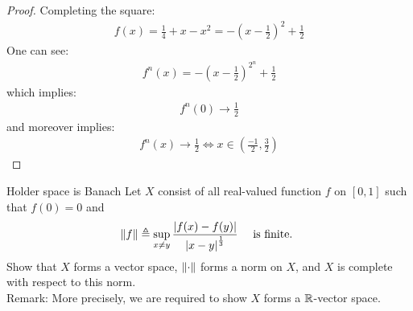 \documentclass{report}
\begin{document}
\begin{proof}
Completing the square: 
\begin{align*}
f(x) = \frac{1}{4}+ x-x^2= - (x-\frac{1}{2})^2+ \frac{1}{2} 
\end{align*}
One can see: 
\begin{align*}
  f^n(x)= - (x- \frac{1}{2})^{2^n}+ \frac{1}{2}
\end{align*}
which implies: 
\begin{align*}
f^n(0) \rightarrow \frac{1}{2} 
\end{align*}
and moreover implies: 
\begin{align*}
  f^n(x)\rightarrow \frac{1}{2}\iff  x \in \left(\frac{-1}{2},\frac{3}{2}\right)
\end{align*}
\end{proof}
\begin{question}{Holder space is Banach}{}
Let $X$ consist of all real-valued function $f$ on  $[0,1]$ such that $f(0)=0$ and 
 \begin{align*}
\left\| f \right\|\triangleq \sup_{x\neq y} \frac{\left|f(x)-f(y)\right|}{\left|x-y\right|^{\frac{1}{3}}} \quad \text{ is finite. }
\end{align*}
Show that $X$ forms a vector space,  $\left\| \cdot \right\|$ forms a norm on $X$, and  $X$ is complete with respect to this norm. \\

Remark: More precisely, we are required to show $X$ forms a $\mathbb{R}$-vector space.
\end{question}
\end{document}
